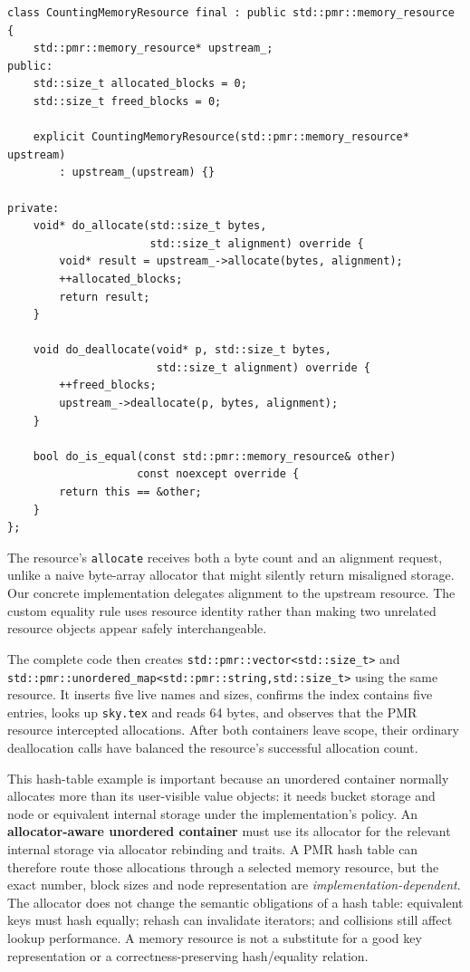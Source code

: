 \begin{verbatim}
class CountingMemoryResource final : public std::pmr::memory_resource {
    std::pmr::memory_resource* upstream_;
public:
    std::size_t allocated_blocks = 0;
    std::size_t freed_blocks = 0;

    explicit CountingMemoryResource(std::pmr::memory_resource* upstream)
        : upstream_(upstream) {}

private:
    void* do_allocate(std::size_t bytes,
                      std::size_t alignment) override {
        void* result = upstream_->allocate(bytes, alignment);
        ++allocated_blocks;
        return result;
    }

    void do_deallocate(void* p, std::size_t bytes,
                       std::size_t alignment) override {
        ++freed_blocks;
        upstream_->deallocate(p, bytes, alignment);
    }

    bool do_is_equal(const std::pmr::memory_resource& other)
                    const noexcept override {
        return this == &other;
    }
};
\end{verbatim}

The resource's \texttt{allocate} receives both a byte count and an alignment request, unlike a naive byte-array allocator that might silently return misaligned storage. Our concrete implementation delegates alignment to the upstream resource. The custom equality rule uses resource identity rather than making two unrelated resource objects appear safely interchangeable.

The complete code then creates \texttt{std::pmr::vector\textless{}std::size\_t\textgreater{}} and \texttt{std::pmr::unordered\_map\textless{}std::pmr::string,std::size\_t\textgreater{}} using the same resource. It inserts five live names and sizes, confirms the index contains five entries, looks up \texttt{sky.tex} and reads 64 bytes, and observes that the PMR resource intercepted allocations. After both containers leave scope, their ordinary deallocation calls have balanced the resource's successful allocation count.

This hash-table example is important because an unordered container normally allocates more than its user-visible value objects: it needs bucket storage and node or equivalent internal storage under the implementation's policy. An \textbf{allocator-aware unordered container} must use its allocator for the relevant internal storage via allocator rebinding and traits. A PMR hash table can therefore route those allocations through a selected memory resource, but the exact number, block sizes and node representation are \emph{implementation-dependent}. The allocator does not change the semantic obligations of a hash table: equivalent keys must hash equally; rehash can invalidate iterators; and collisions still affect lookup performance. A memory resource is not a substitute for a good key representation or a correctness-preserving hash/equality relation.


